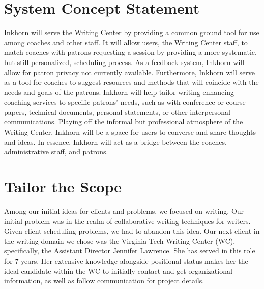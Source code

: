 \documentclass[12pt]{article} %
\begin{document}
\newpage
\section{System Concept Statement} %
  Inkhorn will serve the Writing Center by providing a common ground tool for use among coaches and other staff.
  It will allow users, the Writing Center staff, to match coaches with patrons requesting a session by providing a more systematic, but still personalized, scheduling process.
  As a feedback system, Inkhorn will allow for patron privacy not currently available.
  Furthermore, Inkhorn will serve as a tool for coaches to suggest resources and methods that will coincide with the needs and goals of the patrons.
  Inkhorn will help tailor writing enhancing coaching services to specific patrons’ needs, such as with conference or course papers, technical documents, personal statements, or other interpersonal communications.
  Playing off the informal but professional atmosphere of the Writing Center, Inkhorn will be a space for users to converse and share thoughts and ideas.
  In essence, Inkhorn will act as a bridge between the coaches, administrative staff, and patrons.

\section{Tailor the Scope} %
  Among our initial ideas for clients and problems, we focused on writing.
  Our initial problem was in the realm of collaborative writing techniques for writers.
  Given client scheduling problems, we had to abandon this idea.
  Our next client in the writing domain we chose was the Virginia Tech Writing Center (WC), specifically, the Assistant Director Jennifer Lawrence.
  She has served in this role for 7 years.
  Her extensive knowledge alongside positional status makes her the ideal candidate within the WC to initially contact and get organizational information, as well as follow communication for project details.
  
\end{document}
